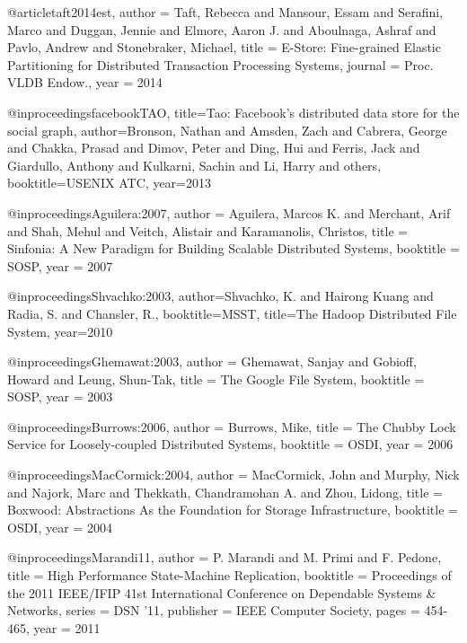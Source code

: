 

@article{taft2014est,
 author = {Taft, Rebecca and Mansour, Essam and Serafini, Marco and Duggan, Jennie and Elmore, Aaron J. and Aboulnaga, Ashraf and Pavlo, Andrew and Stonebraker, Michael},
 title = {{E-Store}: Fine-grained Elastic Partitioning for Distributed Transaction Processing Systems},
 journal = {Proc. VLDB Endow.},
 year = {2014}
} 

@inproceedings{facebookTAO,
  title={Tao: Facebook's distributed data store for the social graph},
  author={Bronson, Nathan and Amsden, Zach and Cabrera, George and Chakka, Prasad and Dimov, Peter and Ding, Hui and Ferris, Jack and Giardullo, Anthony and Kulkarni, Sachin and Li, Harry and others},
  booktitle={USENIX ATC},
  year={2013}
}

@inproceedings{Aguilera:2007,
 author = {Aguilera, Marcos K. and Merchant, Arif and Shah, Mehul and Veitch, Alistair and Karamanolis, Christos},
 title = {Sinfonia: A New Paradigm for Building Scalable Distributed Systems},
 booktitle = {SOSP},
 year = {2007}
 } 

@inproceedings{Shvachko:2003, 
author={Shvachko, K. and Hairong Kuang and Radia, S. and Chansler, R.}, 
booktitle={MSST}, 
title={The Hadoop Distributed File System}, 
year={2010}
}

@inproceedings{Ghemawat:2003,
 author = {Ghemawat, Sanjay and Gobioff, Howard and Leung, Shun-Tak},
 title = {The Google File System},
 booktitle = {SOSP},
 year = {2003}
} 

@inproceedings{Burrows:2006,
 author = {Burrows, Mike},
 title = {The Chubby Lock Service for Loosely-coupled Distributed Systems},
 booktitle = {OSDI},
 year = {2006}
 } 

@inproceedings{MacCormick:2004,
 author = {MacCormick, John and Murphy, Nick and Najork, Marc and Thekkath, Chandramohan A. and Zhou, Lidong},
 title = {Boxwood: Abstractions As the Foundation for Storage Infrastructure},
 booktitle = {OSDI},
 year = {2004}
 } 


@inproceedings{Marandi11,
   author    = {P. Marandi and M. Primi and F. Pedone},
   title     = {High Performance State-Machine Replication},
   booktitle = {Proceedings of the 2011 IEEE/IFIP 41st International Conference on Dependable Systems \& Networks},
   series    = {DSN '11},
   publisher = {{IEEE} Computer Society},
   pages     = {454-465},
   year      = {2011}
}

